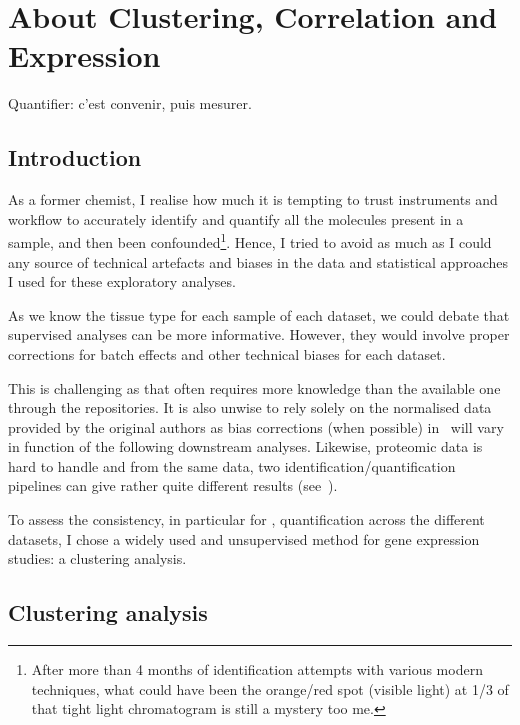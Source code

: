 \chapter{About Clustering, Correlation and Expression}
\label{ch:expression}

\setlength{\epigraphwidth}{0.45\textwidth}
\setlength{\epigraphrule}{0.1pt}
\epigraph{Quantifier: c'est convenir, puis mesurer.}{\cite{Desrosieres}}

\section{Introduction}

As a former chemist, I realise how much it is tempting to trust instruments and
workflow to accurately identify and quantify all the molecules present in a sample,
and then been confounded\footnote{After more than 4 months of identification attempts
with various modern techniques, what could have been the orange/red spot
(visible light) at 1/3 of that tight light chromatogram is still a mystery too me.}.
Hence, I tried to avoid as much as I could any source of technical
artefacts and biases in the data and statistical approaches I used for these
exploratory analyses.

As we know the tissue type for each sample of each dataset,
we could debate that supervised analyses can be more informative.
However, they would involve proper corrections
for batch effects and other technical biases for each dataset.

This is challenging as that often requires more knowledge than the available one
through the repositories. It is also unwise to rely solely on the normalised data
provided by the original authors as bias corrections (when possible)
in \Rnaseq\ will vary in function of the following downstream analyses.
Likewise, proteomic data is hard to handle and from the same data,
two identification/quantification pipelines can give rather quite
different results (see~).

To assess the consistency, in particular for \Rnaseq, quantification across
the different datasets, I chose a widely used and unsupervised method for gene
expression studies: a clustering analysis.

\section{Clustering analysis}

